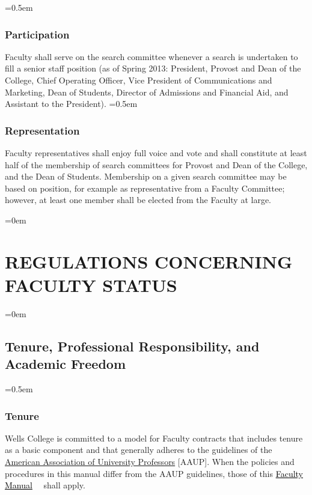 \documentclass{manual}
\let\stdsection\section %
\renewcommand\section{\newpage\stdsection}
\newcommand{\keyword}[1]{\textcolor{black}{#1}}
\newcommand{\facman}{\keyword{\underline{Faculty Manual}}~}
\let\oldsection\section
\renewcommand\section{\leftskip=0em\oldsection}
\let\oldsubsection\subsection
\renewcommand\subsection{\leftskip=0em\oldsubsection}
\let\oldsubsubsection\subsubsection
\renewcommand\subsubsection{\leftskip=0.5em\oldsubsubsection}
\begin{document}
\subsubsection{Participation}
Faculty shall serve on the search committee whenever a search is undertaken to fill a senior staff position (as of Spring 2013: President, Provost and Dean of the College, Chief Operating Officer, Vice President of Communications and Marketing, Dean of Students, Director of Admissions and Financial Aid, and Assistant to the President).
\subsubsection{Representation}
Faculty representatives shall enjoy full voice and vote and shall constitute at least half of the membership of search committees for Provost and Dean of the College, and the Dean of Students. Membership on a given search committee may be based on position, for example as representative from a Faculty Committee; however, at least one member shall be elected from the Faculty at large.


\section{REGULATIONS CONCERNING FACULTY STATUS}\label{art:RegulationsConcerningFacultyStatus}

\subsection{Tenure, Professional Responsibility, and Academic Freedom}\label{sec:TenureProfessionalResponsibilityAndAcademicFreedom}

\subsubsection{Tenure}

Wells College is committed to a model for Faculty contracts that includes tenure as a basic component and that generally adheres to the guidelines of the \href{http://www.aaup.org/AAUP/}{American Association of University Professors} [AAUP]. When the policies and procedures in this manual differ from the AAUP guidelines, those of this \facman~ shall apply.
\end{document}
